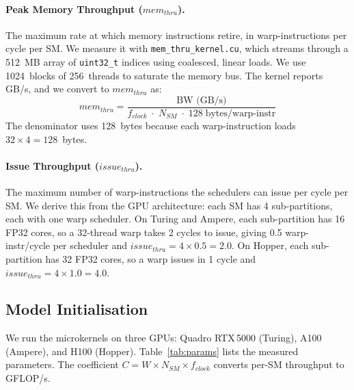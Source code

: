 \paragraph{Peak Memory Throughput ($mem_{thru}$).}
The maximum rate at which memory instructions retire, in warp-instructions
per cycle per SM.
We measure it with \texttt{mem\_thru\_kernel.cu}, which streams through a
512~MB array of \texttt{uint32\_t} indices using coalesced, linear loads.
We use 1024~blocks of 256~threads to saturate the memory bus.
The kernel reports GB/s, and we convert to $mem_{thru}$ as:
%
\begin{equation}
mem_{thru} = \frac{\text{BW (GB/s)}}{f_{clock} \;\cdot\; N_{SM} \;\cdot\; 128\;\text{bytes/warp-instr}}
\label{eq:mem_thru}
\end{equation}
%
The denominator uses 128~bytes because each warp-instruction loads
$32 \times 4 = 128$~bytes.


\paragraph{Issue Throughput ($issue_{thru}$).}
The maximum number of warp-instructions the schedulers can issue per cycle
per SM.
We derive this from the GPU architecture:
each SM has 4 sub-partitions, each with one warp scheduler.
On Turing and Ampere, each sub-partition has 16 FP32 cores, so a 32-thread
warp takes 2 cycles to issue, giving 0.5 warp-instr/cycle per scheduler
and $issue_{thru} = 4 \times 0.5 = 2.0$.
On Hopper, each sub-partition has 32 FP32 cores, so a warp issues in 1 cycle
and $issue_{thru} = 4 \times 1.0 = 4.0$.


\subsection{Model Initialisation}
\label{subsec:model_init}

We run the microkernels on three GPUs: Quadro RTX\,5000 (Turing),
A100 (Ampere), and H100 (Hopper).
Table~\ref{tab:params} lists the measured parameters.
The coefficient $C = W \times N_{SM} \times f_{clock}$
converts per-SM throughput to GFLOP/s.

